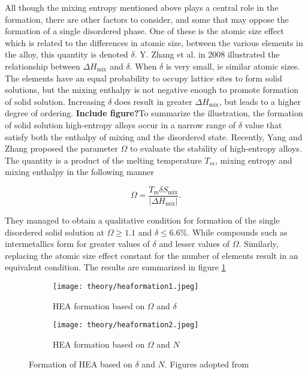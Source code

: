 All though the mixing entropy mentioned above plays a central role in the formation, there are other factors to consider, and some that may oppose the formation of a single disordered phase. One of these is the atomic size effect which is related to the differences in atomic size, between the various elements in the alloy, this quantity is denoted $\delta$. Y. Zhang et al. in 2008 illustrated the relationship between $\Delta H_\text{mix}$ and $\delta$. When $\delta$ is very small, ie similar atomic sizes. The elements have an equal probability to occupy lattice sites to form solid solutions, but the mixing enthalpy is not negative enough to promote formation of solid solution. Increasing $\delta$ does result in greater $\Delta H_\text{mix}$, but leads to a higher degree of ordering. \textbf{Include figure?}To summarize the illustration, the formation of solid solution high-entropy alloys occur in a narrow range of $\delta$ value that satisfy both the enthalpy of mixing and the disordered state. Recently, Yang and Zhang proposed the parameter $\Omega$ to evaluate the stability of high-entropy alloys. The quantity is a product of the melting temperature $T_m$, mixing entropy and mixing enthalpy in the following manner

\begin{equation}
\Omega = \frac{T_\text{m} \delta S_\text{mix}}{|\Delta H_\text{mix}|}.
\end{equation}

They managed to obtain a qualitative condition for formation of the single disordered solid solution at $\Omega \geq 1.1$ and $\delta \leq 6.6\%$. While compounds such as intermetallics form for greater values of $\delta$ and lesser values of $\Omega$. Similarly, replacing the atomic size effect constant for the number of elements result in an equivalent condition. The results are summarized in figure \ref{Omega}

\begin{figure} 
\centering
\begin{subfigure}{0.7\textwidth}
\texttt{[image: theory/heaformation1.jpeg]}
\caption{HEA formation based on $\Omega$ and $\delta$}
\end{subfigure}
\begin{subfigure}{0.7\textwidth}
\texttt{[image: theory/heaformation2.jpeg]}
\caption{HEA formation based on $\Omega$ and $N$}
\end{subfigure}
\caption{Formation of HEA based on $\delta$ and $N$. Figures adopted from \cite{hea2016_ch2}}
\label{Omega} 
\end{figure} 

